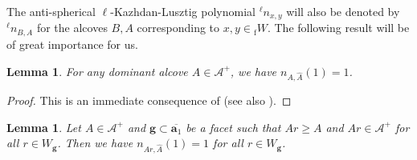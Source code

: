 \documentclass[11pt]{amsart}
\theoremstyle{plain}
\newtheorem{lem}[thm]{Lemma}
\theoremstyle{remark}
\numberwithin{equation}{section}
\begin{document}
	The anti-spherical $\ell$-Kazhdan-Lusztig polynomial ${^\ell n}_{x,y}$ will also be denoted by ${^\ell n}_{B,A}$ for the alcoves $B,A$ corresponding to $x,y\in {_\mathrm{f}W}$. The following result will be of great importance for us.
	\begin{lem}\label{lem askl1}
		For any dominant alcove $A\in\mathcal{A}^+$, we have $n_{A,\hat{A}}(1)=1$.
	\end{lem}
	\begin{proof}
		This is an immediate consequence of \cite[Theorem 5.1]{Soergel1997KazhdanLusztigPA} (see also \cite[§7]{Soergel1997KazhdanLusztigPA}).
	\end{proof}
	
	\begin{lem}\label{lem hat}
		Let $A\in\mathcal{A}^+$ and $\mathbf{g}\subset\overline{\mathbf{a}_1}$ be a facet such that $Ar\geq A$ and $Ar\in\mathcal{A}^+$ for all $r\in W_\mathbf{g}$. Then we have $n_{Ar,\hat{A}}(1)=1$ for all $r\in W_\mathbf{g}$.
	\end{lem}
	
\end{document}
